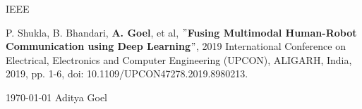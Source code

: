 \documentclass[11pt, a4paper]{awesome-cv} %
\begin{document}




\begin{cventries}

  \cventry
  {}
  {IEEE} {} {}
  {
    \begin{cvitems}
        \item {P. Shukla, B. Bhandari, \textbf{A. Goel}, et al, \textbf{$"$Fusing Multimodal Human-Robot Communication using Deep Learning$"$}, 2019 International Conference on Electrical, Electronics and Computer Engineering (UPCON), ALIGARH, India, 2019, pp. 1-6, doi: 10.1109/UPCON47278.2019.8980213.}
    \end{cvitems}}
\end{cventries}









\makecvfooter
  {\today}
  {Aditya Goel}
  {\thepage}


% 
% 
% 
% 
% 
% 
% 
% 


\end{document}
